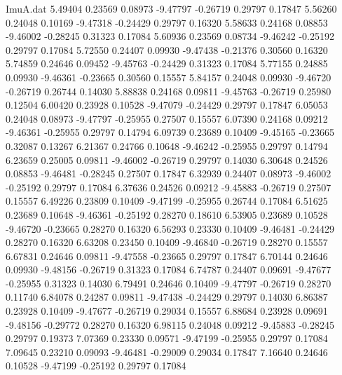 \begin{filecontents}{ImuA.dat}
   5.49404    0.23569    0.08973   -9.47797   -0.26719    0.29797    0.17847
   5.56260    0.24048    0.10169   -9.47318   -0.24429    0.29797    0.16320
   5.58633    0.24168    0.08853   -9.46002   -0.28245    0.31323    0.17084
   5.60936    0.23569    0.08734   -9.46242   -0.25192    0.29797    0.17084
   5.72550    0.24407    0.09930   -9.47438   -0.21376    0.30560    0.16320
   5.74859    0.24646    0.09452   -9.45763   -0.24429    0.31323    0.17084
   5.77155    0.24885    0.09930   -9.46361   -0.23665    0.30560    0.15557
   5.84157    0.24048    0.09930   -9.46720   -0.26719    0.26744    0.14030
   5.88838    0.24168    0.09811   -9.45763   -0.26719    0.25980    0.12504
   6.00420    0.23928    0.10528   -9.47079   -0.24429    0.29797    0.17847
   6.05053    0.24048    0.08973   -9.47797   -0.25955    0.27507    0.15557
   6.07390    0.24168    0.09212   -9.46361   -0.25955    0.29797    0.14794
   6.09739    0.23689    0.10409   -9.45165   -0.23665    0.32087    0.13267
   6.21367    0.24766    0.10648   -9.46242   -0.25955    0.29797    0.14794
   6.23659    0.25005    0.09811   -9.46002   -0.26719    0.29797    0.14030
   6.30648    0.24526    0.08853   -9.46481   -0.28245    0.27507    0.17847
   6.32939    0.24407    0.08973   -9.46002   -0.25192    0.29797    0.17084
   6.37636    0.24526    0.09212   -9.45883   -0.26719    0.27507    0.15557
   6.49226    0.23809    0.10409   -9.47199   -0.25955    0.26744    0.17084
   6.51625    0.23689    0.10648   -9.46361   -0.25192    0.28270    0.18610
   6.53905    0.23689    0.10528   -9.46720   -0.23665    0.28270    0.16320
   6.56293    0.23330    0.10409   -9.46481   -0.24429    0.28270    0.16320
   6.63208    0.23450    0.10409   -9.46840   -0.26719    0.28270    0.15557
   6.67831    0.24646    0.09811   -9.47558   -0.23665    0.29797    0.17847
   6.70144    0.24646    0.09930   -9.48156   -0.26719    0.31323    0.17084
   6.74787    0.24407    0.09691   -9.47677   -0.25955    0.31323    0.14030
   6.79491    0.24646    0.10409   -9.47797   -0.26719    0.28270    0.11740
   6.84078    0.24287    0.09811   -9.47438   -0.24429    0.29797    0.14030
   6.86387    0.23928    0.10409   -9.47677   -0.26719    0.29034    0.15557
   6.88684    0.23928    0.09691   -9.48156   -0.29772    0.28270    0.16320
   6.98115    0.24048    0.09212   -9.45883   -0.28245    0.29797    0.19373
   7.07369    0.23330    0.09571   -9.47199   -0.25955    0.29797    0.17084
   7.09645    0.23210    0.09093   -9.46481   -0.29009    0.29034    0.17847
   7.16640    0.24646    0.10528   -9.47199   -0.25192    0.29797    0.17084

\end{filecontents}
